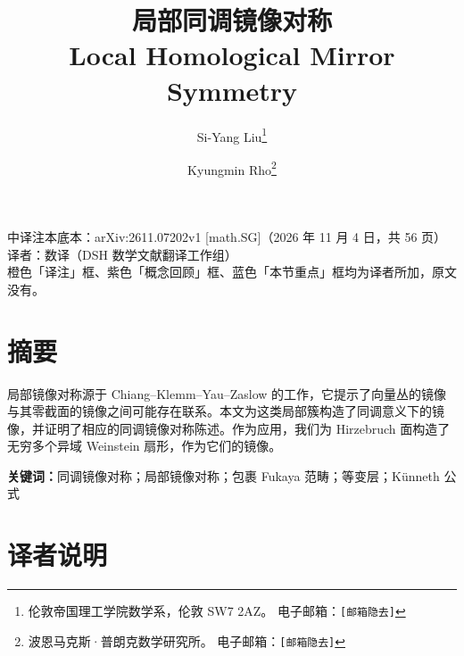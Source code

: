 \documentclass[11pt,a4paper]{article}
\theoremstyle{cnth}
\begin{document}
\title{\bfseries 局部同调镜像对称\\[6pt]
       \large Local Homological Mirror Symmetry}
\author{Si-Yang Liu\thanks{伦敦帝国理工学院数学系，伦敦 SW7 2AZ。
        电子邮箱：\texttt{[邮箱隐去]}}
        \and Kyungmin Rho\thanks{波恩马克斯·普朗克数学研究所。
        电子邮箱：\texttt{[邮箱隐去]}}}
\date{}

\maketitle

\begin{center}
\small
中译注本\quad 底本：arXiv:2611.07202v1 [math.SG]（2026 年 11 月 4 日，共 56 页）\\[2pt]
译者：数译（DSH 数学文献翻译工作组）\\
橙色「译注」框、紫色「概念回顾」框、蓝色「本节重点」框均为译者所加，原文没有。
\end{center}

\vspace{0.8em}

\section*{摘要}
局部镜像对称源于 Chiang--Klemm--Yau--Zaslow 的工作，它提示了向量丛的镜像与其零截面的镜像之间可能存在联系。本文为这类局部簇构造了同调意义下的镜像，并证明了相应的同调镜像对称陈述。作为应用，我们为 Hirzebruch 面构造了无穷多个异域 Weinstein 扇形，作为它们的镜像。

\vspace{0.6em}
\noindent\textbf{关键词：}同调镜像对称；局部镜像对称；包裹 Fukaya 范畴；等变层；Künneth 公式

\clearpage

\section*{译者说明}
\end{document}
